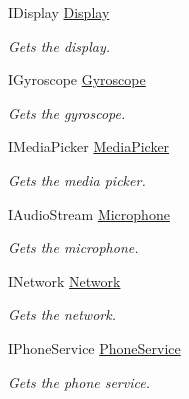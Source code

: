 \begin{DoxyCompactItemize}
I\+Display \hyperlink{classClient_1_1Common_1_1Models_1_1Device_a5f60c2325f0cb3d3b79e42a403520c1e}{Display}
\begin{DoxyCompactList}\small\item\em Gets the display. \end{DoxyCompactList}\item 
I\+Gyroscope \hyperlink{classClient_1_1Common_1_1Models_1_1Device_a27b2c554bccbca57b1c4b0c474d41492}{Gyroscope}
\begin{DoxyCompactList}\small\item\em Gets the gyroscope. \end{DoxyCompactList}\item 
I\+Media\+Picker \hyperlink{classClient_1_1Common_1_1Models_1_1Device_aedfd6cdd3804beb87a78ddca9fc02c66}{Media\+Picker}
\begin{DoxyCompactList}\small\item\em Gets the media picker. \end{DoxyCompactList}\item 
I\+Audio\+Stream \hyperlink{classClient_1_1Common_1_1Models_1_1Device_a6f726201e56a1d46ef8ebd20adf638df}{Microphone}
\begin{DoxyCompactList}\small\item\em Gets the microphone. \end{DoxyCompactList}\item 
I\+Network \hyperlink{classClient_1_1Common_1_1Models_1_1Device_a46cdd7f011a2059ee7a3f1e18bc9fae6}{Network}
\begin{DoxyCompactList}\small\item\em Gets the network. \end{DoxyCompactList}\item 
I\+Phone\+Service \hyperlink{classClient_1_1Common_1_1Models_1_1Device_ad96d3be9bec959a2900b8ff9c3133174}{Phone\+Service}
\begin{DoxyCompactList}\small\item\em Gets the phone service. \end{DoxyCompactList}\item 

\end{DoxyCompactItemize}
